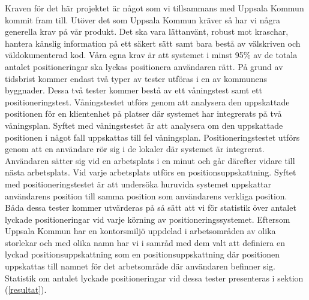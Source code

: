 \documentclass[a4paper,12pt]{article}
\begin{document}

 Kraven för det här projektet är något som vi tillsammans med Uppsala Kommun kommit fram till. Utöver det som Uppsala Kommun kräver så har vi några generella krav på vår produkt. Det ska vara lättanvänt, robust mot kraschar, hantera känslig information på ett säkert sätt samt bara bestå av välskriven och väldokumenterad kod. Våra egna krav är att systemet i minst 95\% av de totala antalet positioneringar ska lyckas positionera användaren rätt. På grund av tidsbrist kommer endast två typer av tester utföras i en av kommunens byggnader. Dessa två tester kommer bestå av ett våningstest samt ett positioneringstest. Våningstestet utförs genom att analysera den uppskattade positionen för en klientenhet på platser där systemet har integrerats på två våningsplan. Syftet med våningstestet är att analysera om den uppskattade positionen i något fall uppskattas till fel våningsplan. Positioneringstestet utförs genom att en användare rör sig i de lokaler där systemet är integrerat. Användaren sätter sig vid en arbetsplats i en minut och går därefter vidare till nästa arbetsplats. Vid varje arbetsplats utförs en positionsuppskattning. Syftet med positioneringstestet är att undersöka huruvida systemet uppskattar användarens position till samma position som användarens verkliga position.
 Båda dessa tester kommer utvärderas på så sätt att vi för statistik över antalet lyckade positioneringar vid varje körning av positioneringssystemet. Eftersom Uppsala Kommun har en kontorsmiljö uppdelad i arbetsområden av olika storlekar och med olika namn har vi i samråd med dem valt att definiera en lyckad positionsuppskattning som en positionsuppskattning där  positionen uppskattas till namnet för det arbetsområde där användaren befinner sig.
 Statistik om antalet lyckade positioneringar vid dessa tester presenteras i sektion (\ref{resultat}).
\end{document}
